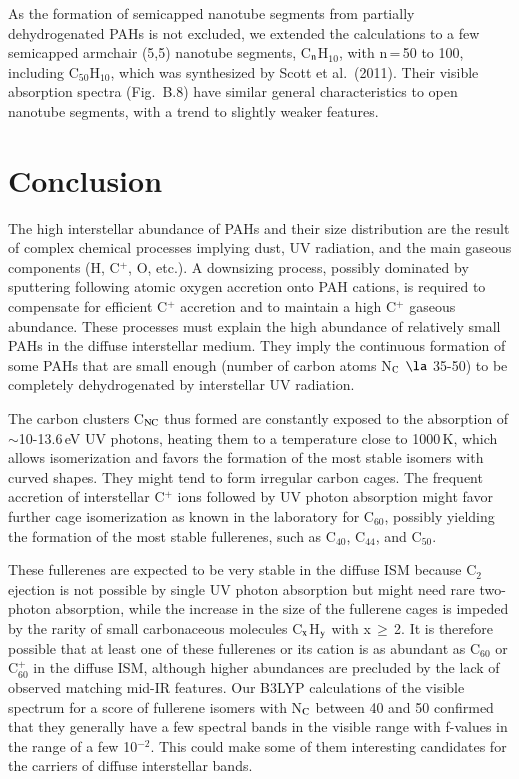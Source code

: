 \documentclass{aa}
\begin{document}
As the formation of semicapped nanotube segments from partially dehydrogenated PAHs  is not excluded,  we extended the calculations to a few  semicapped  armchair (5,5) nanotube segments, C$_{\rm n}$H$_{10}$, with n\,=\,50 to 100, including C$_{50}$H$_{10}$, which was synthesized by Scott 
et al.\ (2011). 
Their visible absorption spectra (Fig.\ B.8) have similar general characteristics to open nanotube segments, with a trend to slightly weaker features.

\section{Conclusion}
The high interstellar abundance of PAHs and their size distribution are the result of complex chemical processes implying dust, UV radiation, and the main  gaseous components (H, C$^+$, O, etc.). 
A downsizing process, possibly dominated by sputtering following atomic oxygen accretion onto PAH cations,
is required to compensate for  efficient C$^+$ accretion and to maintain a 
high C$^+$ gaseous abundance. 
These processes must explain the high abundance of relatively small PAHs in the diffuse interstellar medium. They imply the continuous  formation of some PAHs that are small enough (number of carbon atoms N$_{\rm C}$ $\la$ 35-50) to be completely dehydrogenated by interstellar UV radiation. 

The carbon clusters C$_{\rm NC}$ thus formed are constantly exposed to the absorption of $\sim$10-13.6\,eV UV photons, heating them to a temperature 
close to 1000\,K, which allows isomerization and favors the formation of the most stable isomers with curved shapes.  They might tend to form irregular carbon cages.
The frequent accretion of interstellar C$^+$ ions followed by UV photon absorption might favor further cage isomerization as known in the laboratory for C$_{60}$, possibly yielding the formation of the most stable fullerenes, such as C$_{40}$, C$_{44}$, and C$_{50}$. 

These fullerenes are expected to be very stable in the diffuse ISM because C$_2$ ejection is not possible by single UV photon absorption but might need rare two-photon absorption, while the increase in the size  of the fullerene cages is impeded by the rarity of small carbonaceous molecules C$_{\rm x}$H$_{\rm y}$ with x\,$\ge$\,2. 
It is therefore possible that at least one of these fullerenes or its cation is as abundant as C$_{60}$ or C$_{60}^+$ in the diffuse ISM, although 
higher abundances are precluded by the lack of observed  matching mid-IR features. 
Our B3LYP calculations of the visible spectrum for a score of fullerene isomers  with  N$_{\rm C}$ between 40 and 50 confirmed that they generally have a few spectral bands in the visible range with f-values in the range of a few 10$^{-2}$. 
This could make some of them interesting candidates for the carriers of  diffuse interstellar bands. 
\end{document}
